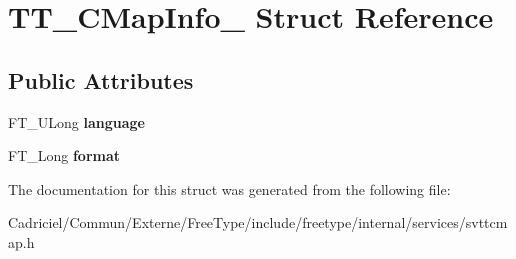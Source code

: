 \hypertarget{struct_t_t___c_map_info__}{}\section{T\+T\+\_\+\+C\+Map\+Info\+\_\+ Struct Reference}
\label{struct_t_t___c_map_info__}
\subsection*{Public Attributes}
\begin{DoxyCompactItemize}
\item 
F\+T\+\_\+\+U\+Long {\bfseries language}\hypertarget{struct_t_t___c_map_info___a4096f460af57f87cb9434a411c502d86}{}\label{struct_t_t___c_map_info___a4096f460af57f87cb9434a411c502d86}

\item 
F\+T\+\_\+\+Long {\bfseries format}\hypertarget{struct_t_t___c_map_info___a122d56b4755597f134fcf4865cb0a4fc}{}\label{struct_t_t___c_map_info___a122d56b4755597f134fcf4865cb0a4fc}

\end{DoxyCompactItemize}


The documentation for this struct was generated from the following file\+:\begin{DoxyCompactItemize}
\item 
Cadriciel/\+Commun/\+Externe/\+Free\+Type/include/freetype/internal/services/svttcmap.\+h\end{DoxyCompactItemize}
